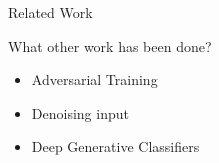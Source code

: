 \begin{frame}{Related Work}

    \begin{block}{What other work has been done?}

        \begin{itemize}
            \item Adversarial Training
            \item Denoising input
            \item Deep Generative Classifiers
        \end{itemize}

    \end{block}

\end{frame}